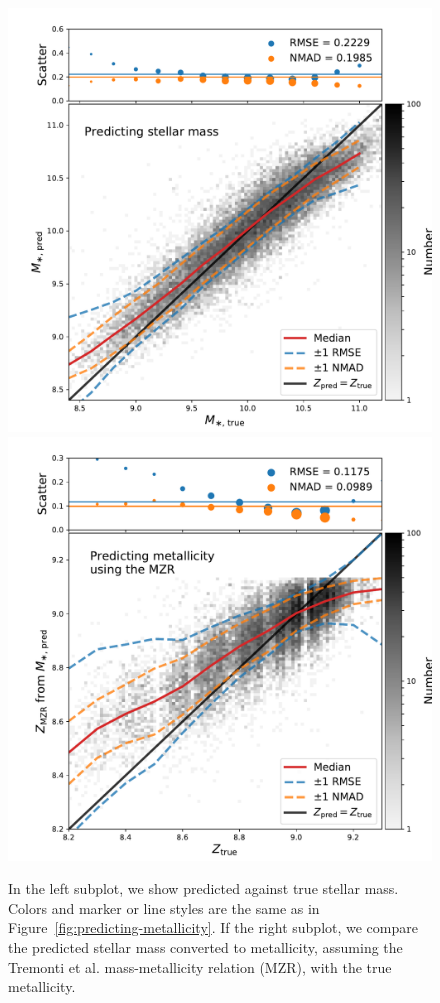 \documentclass[fleqn,usenatbib]{mnras}
\begin{document}
\begin{figure}
	\includegraphics[width=\columnwidth]{04-a-prediction_mass.pdf}
	\includegraphics[width=\columnwidth]{04-b-prediction_mzr.pdf}
	\caption{\label{fig:mass-metallicity}
		In the left subplot, we show predicted against true stellar mass. 
		Colors and marker or line styles are the same as in Figure~\ref{fig:predicting-metallicity}.
		If the right subplot, we compare the predicted stellar mass converted to metallicity, assuming the Tremonti et al. mass-metallicity relation (MZR), with the true metallicity.}
\end{figure}
\end{document}
